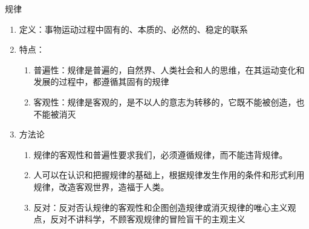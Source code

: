 \documentclass[12pt]{book}
\begin{document}
规律
\begin{enumerate}[1.]
    \item 定义：事物运动过程中固有的、本质的、必然的、稳定的联系
    \item 特点：
          \begin{enumerate}[(1)]
              \item 普遍性：规律是普遍的，自然界、人类社会和人的思维，在其运动变化和发展的过程中，都遵循其固有的规律
              \item 客观性：规律是客观的，是不以人的意志为转移的，它既不能被创造，也不能被消灭
          \end{enumerate}
    \item 方法论
          \begin{enumerate}[(1)]
              \item 规律的客观性和普遍性要求我们，必须遵循规律，而不能违背规律。
              \item 人可以在认识和把握规律的基础上，根据规律发生作用的条件和形式利用规律，改造客观世界，造福于人类。
              \item 反对：反对否认规律的客观性和企图创造规律或消灭规律的唯心主义观点，反对不讲科学，不顾客观规律的冒险盲干的主观主义
          \end{enumerate}
\end{enumerate}
\end{document}
